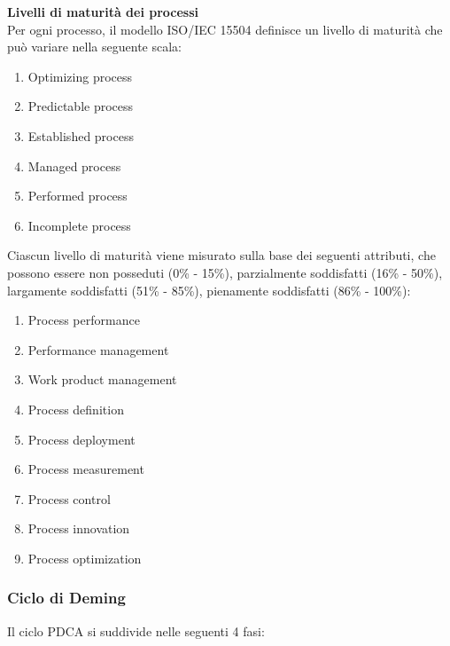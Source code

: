 		\textbf{Livelli di maturità dei processi}\\

		Per ogni processo, il modello ISO/IEC 15504 definisce un livello di maturità che può variare nella seguente scala:
		
		\begin{enumerate}

			\item Optimizing process
			\item Predictable process
			\item Established process
			\item Managed process
			\item Performed process
			\item Incomplete process

		\end{enumerate}
		
		Ciascun livello di maturità viene misurato sulla base dei seguenti attributi, che possono essere non posseduti (0\% - 15\%), parzialmente soddisfatti (16\% - 50\%), largamente soddisfatti (51\% - 85\%), pienamente soddisfatti (86\% - 100\%):
		
		\begin{enumerate}
		
			\item Process performance
			\item Performance management
			\item Work product management
			\item Process definition
			\item Process deployment
			\item Process measurement
			\item Process control
			\item Process innovation
			\item Process optimization
			
		\end{enumerate}
		
		\subsubsection{Ciclo di Deming} \label{App:AppendixC}
		
			Il ciclo PDCA si suddivide nelle seguenti 4 fasi:
			
